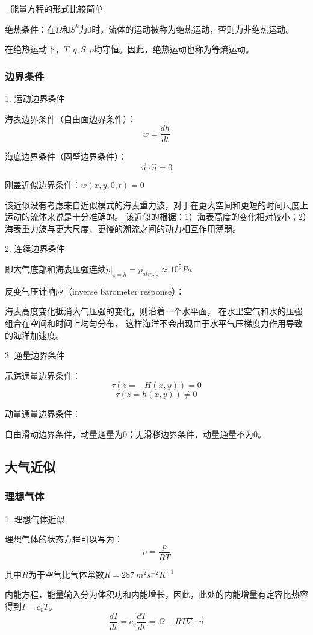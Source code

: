 \documentclass{article}
\begin{document}
- 能量方程的形式比较简单

绝热条件：在$\Omega$和$S^{k}$为$0$时，流体的运动被称为绝热运动，否则为非绝热运动。

在绝热运动下，$T,\eta,S,\rho$均守恒。因此，绝热运动也称为等熵运动。

\subsubsection{边界条件}

1. 运动边界条件

海表边界条件（自由面边界条件）：$$w=\frac{dh}{dt}$$

海底边界条件（固壁边界条件）：$$\vec{u}\cdot\hat{n}=0$$

刚盖近似边界条件：$w(x,y,0,t)=0$

该近似没有考虑来自近似模式的海表重力波，对于在更大空间和更短的时间尺度上运动的流体来说是十分准确的。
该近似的根据：1）海表高度的变化相对较小；2）海表重力波与更大尺度、更慢的潮流之间的动力相互作用薄弱。

2. 连续边界条件

即大气底部和海表压强连续$p|_{z=h}=p_{atm,0}\approx10^{5}Pa$

反变气压计响应（inverse barometer response）：

海表高度变化抵消大气压强的变化，则沿着一个水平面，
在水里空气和水的压强组合在空间和时间上均匀分布，
这样海洋不会出现由于水平气压梯度力作用导致的海洋加速度。

3. 通量边界条件

示踪通量边界条件：
$$\tau(z=-H(x,y))=0$$
$$\tau(z=h(x,y))\ne0$$

动量通量边界条件：

自由滑动边界条件，动量通量为$0$；无滑移边界条件，动量通量不为$0$。

\subsection{大气近似}
\subsubsection{理想气体}
1. 理想气体近似

理想气体的状态方程可以写为：
$$\rho = \frac{p}{RT}$$

其中$R$为干空气比气体常数$R=287 \  m^2s^{-2}K^{-1}$

内能方程，能量输入分为体积功和内能增长，因此，此处的内能增量有定容比热容得到$I=c_vT$。
$$\frac{dI}{dt}=c_v\frac{dT}{dt}=\Omega-RT\nabla\cdot\vec{u}$$
\end{document}
